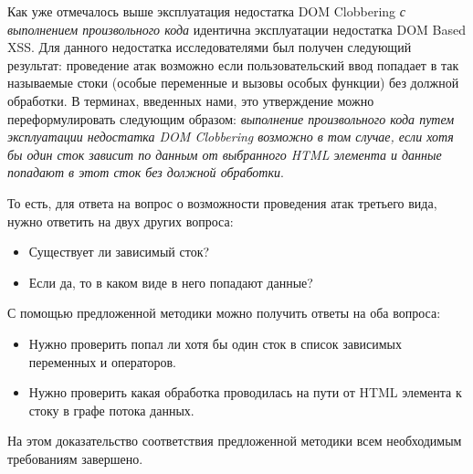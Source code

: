 \bigskip
Как уже отмечалось выше эксплуатация недостатка DOM Clobbering \textit{с выполнением произвольного кода} идентична эксплуатации недостатка DOM Based XSS. Для данного недостатка исследователями был получен следующий результат: проведение атак возможно если пользовательский ввод попадает в так называемые стоки (особые переменные и вызовы особых функции) без должной обработки. В терминах, введенных нами, это утверждение можно переформулировать следующим образом: \textit{выполнение произвольного кода путем эксплуатации недостатка DOM Clobbering возможно в том случае, если хотя бы один сток зависит по данным от выбранного HTML элемента и данные попадают в этот сток без должной обработки}.


То есть, для ответа на вопрос о возможности проведения атак третьего вида, нужно ответить на двух других вопроса:
\begin{itemize}
	\item Существует ли зависимый сток?
	\item Если да, то в каком виде в него попадают данные?
\end{itemize}


С помощью предложенной методики можно получить ответы на оба вопроса:
\begin{itemize}
	\item Нужно проверить попал ли хотя бы один сток в список зависимых переменных и операторов.
	\item Нужно проверить какая обработка проводилась на пути от HTML элемента к стоку в графе потока данных.
\end{itemize}
\bigskip

На этом доказательство соответствия предложенной методики всем необходимым требованиям завершено.

